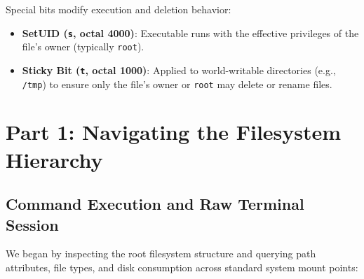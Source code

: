 \documentclass[12pt,a4paper]{article}
\begin{document}
Special bits modify execution and deletion behavior:
\begin{itemize}
    \item \textbf{SetUID (\texttt{s}, octal 4000)}: Executable runs with the effective privileges of the file's owner (typically \texttt{root}).
    \item \textbf{Sticky Bit (\texttt{t}, octal 1000)}: Applied to world-writable directories (e.g., \texttt{/tmp}) to ensure only the file's owner or \texttt{root} may delete or rename files.
\end{itemize}

\newpage

\section{Part 1: Navigating the Filesystem Hierarchy}

\subsection{Command Execution and Raw Terminal Session}
We began by inspecting the root filesystem structure and querying path attributes, file types, and disk consumption across standard system mount points:
\end{document}
